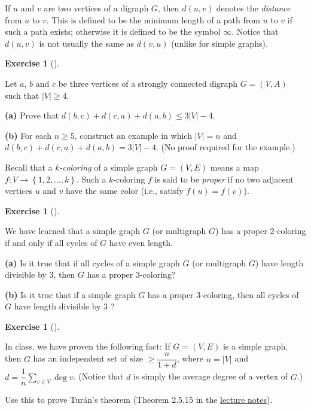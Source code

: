 \documentclass[numbers=enddot,12pt,final,onecolumn,notitlepage]{scrartcl}%
\newcounter{exer}
\theoremstyle{definition}
\newtheorem{exmp}[exer]{Exercise}
\newenvironment{exercise}[1][]
{\begin{exmp}[#1]\begin{leftbar}}
{\end{leftbar}\end{exmp}}
\let\sumnonlimits\sum
\renewcommand{\sum}{\sumnonlimits\limits}
\newcommand{\set}[1]{\left\{ #1 \right\}}
\newcommand{\abs}[1]{\left| #1 \right|}
\newcommand{\tup}[1]{\left( #1 \right)}
\begin{document}
If $u$ and $v$ are two vertices of a digraph $G$, then
$d \tup{u, v}$ denotes the \textit{distance} from $u$ to $v$. This
is defined to be the minimum length of a path from $u$ to $v$ if
such a path exists; otherwise it is defined to be the symbol $\infty$.
Notice that $d \tup{u, v}$ is not usually the same as $d \tup{v, u}$
(unlike for simple graphs).

\begin{exercise} \label{exe.hw3.d+d+d.directed}
Let $a$, $b$ and $c$ be three vertices of a strongly connected
digraph $G = \tup{V, A}$ such that $\abs{V} \geq 4$.

\textbf{(a)} Prove that
$d \tup{b, c} + d \tup{c, a} + d \tup{a, b} \leq 3 \abs{V} - 4$.

\textbf{(b)} For each $n \geq 5$, construct an example in which
$\abs{V} = n$ and
$d \tup{b, c} + d \tup{c, a} + d \tup{a, b} = 3 \abs{V} - 4$.
(No proof required for the example.)
\end{exercise}

Recall that a \textit{$k$-coloring} of a simple graph $G = \tup{V, E}$
means a map $f : V \to \set{1, 2, \ldots, k}$. Such a $k$-coloring $f$
is said to be \textit{proper} if no two adjacent vertices $u$ and $v$
have the same color (i.e., satisfy $f \tup{u} = f \tup{v}$).

\begin{exercise} \label{exe.hw3.not-tripar}
We have learned that a simple graph $G$ (or multigraph $G$)
has a proper $2$-coloring if
and only if all cycles of $G$ have even length.

\textbf{(a)} Is it true that if all cycles of a simple graph $G$ (or
multigraph $G$) have length divisible by $3$, then $G$ has a proper
$3$-coloring?

\textbf{(b)} Is it true that if a simple graph $G$ has a proper
$3$-coloring, then all cycles of $G$ have length divisible by $3$ ?
\end{exercise}

\begin{exercise} \label{exe.hw3.turan}
In class, we have proven the following fact: If $G = \tup{V, E}$ is a
simple graph, then $G$ has an independent set of size
$\geq \dfrac{n}{1+d}$, where $n = \abs{V}$ and
$d = \dfrac{1}{n} \sum_{v \in V} \deg v$. (Notice that $d$ is simply
the average degree of a vertex of $G$.)

Use this to prove Tur\'an's theorem (Theorem 2.5.15 in the
\href{http://www.cip.ifi.lmu.de/~grinberg/t/17s/nogra.pdf}{lecture notes}).
\end{exercise}
\end{document}
